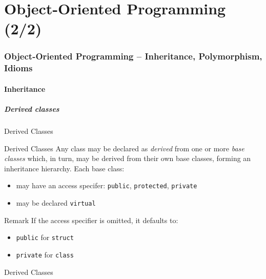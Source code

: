 \part{Object-Oriented Programming (2/2)}
\label{part:oop2}

\section{Object-Oriented Programming -- Inheritance, Polymorphism, Idioms}

\subsection{Inheritance}

\subsubsection{Derived classes}

\begin{frame}{Derived Classes}{}
  \begin{block}{Derived Classes}
    Any class may be declared as \emph{derived} from one or more \emph{base classes} which, in turn, may be derived from their own base classes, forming an inheritance hierarchy. Each base class:
    \begin{itemize}
    \item
      may have an access specifer: \lstinline!public!, \lstinline!protected!, \lstinline!private!
    \item
      may be declared \lstinline!virtual!
    \end{itemize}
  \end{block}

  \begin{block}{Remark}
    If the access specifier is omitted, it defaults to:
    \begin{itemize}
    \item
      \lstinline!public! for \lstinline!struct!
    \item
      \lstinline!private! for \lstinline!class!
    \end{itemize}
  \end{block}
\end{frame}

\begin{frame}{Derived Classes}{}
  \begin{example}
  \end{example}
\end{frame}


